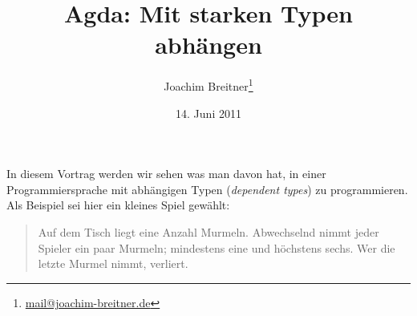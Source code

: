 \documentclass[12pt,parskip=half,headings=normal,abstract]{scrartcl}
\author{Joachim Breitner\footnote{\href{mailto:mail@joachim-breitner.de}{mail@joachim-breitner.de}}}
\title{Agda: Mit starken Typen abhängen}
\date{14. Juni 2011}
\begin{document}
\maketitle

In diesem Vortrag werden wir sehen was man davon hat, in einer Programmiersprache mit abhängigen Typen (\emph{dependent types}) zu programmieren. Als Beispiel sei hier ein kleines Spiel gewählt:

\begin{quote}
Auf dem Tisch liegt eine Anzahl Murmeln. Abwechselnd nimmt jeder Spieler ein paar Murmeln; mindestens eine und höchstens sechs. Wer die letzte Murmel nimmt, verliert.
\end{quote}




\end{document}

